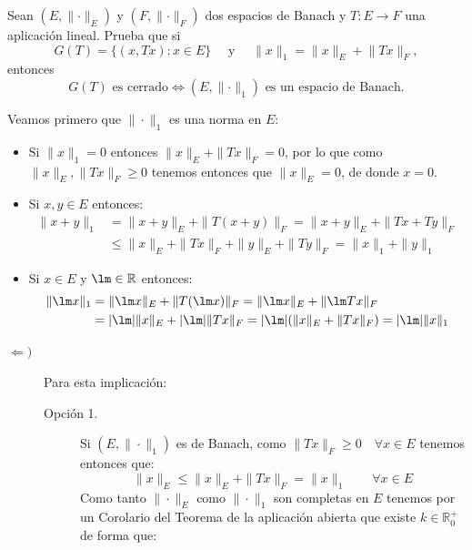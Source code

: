 \documentclass[12pt]{article}
\newcommand{\norma}[1]{\lVert #1 \rVert}
\newcommand{\normagenerica}{\lVert \cdot \rVert}
\begin{document}
    \begin{ejercicio}[3.5 Puntos]
        Sean $(E, \normagenerica_E)$ y $(F, \normagenerica_F)$ dos espacios de Banach y $T : E \to F$ una aplicación lineal. Prueba que si
        $$G(T) = \{(x,Tx) : x \in E\} \quad \text{ y } \quad \norma{x}_1 = \norma{x}_E + \norma{Tx}_F,$$ entonces
        $$G(T) \text{ es cerrado} \iff (E, \normagenerica_1) \text{ es un espacio de Banach.}$$

        \noindent
        Veamos primero que $\|\cdot \|_1$ es una norma en $E$:
        \begin{itemize}
            \item Si $\|x\|_1 = 0$ entonces $\|x\|_E+\|Tx\|_F= 0$, por lo que como $\|x\|_E,\|Tx\|_F\geq 0$ tenemos entonces que $\|x\|_E = 0$, de donde $x=0$.
            \item Si $x,y\in E$ entonces:
                \begin{align*}
                    \|x+y\|_1 &= \|x+y\|_E + \|T(x+y)\|_F = \|x+y\|_E + \|Tx+Ty\|_F \\
                              &\leq \|x\|_E + \|Tx\|_F + \|y\|_E + \|Ty\|_F = \|x\|_1 + \|y\|_1
                \end{align*}
            \item Si $x\in E$ y $\lm\in \mathbb{R}$ entonces:
                \begin{align*}
                    \|\lm x\|_1 &= \|\lm x\|_E + \|T(\lm x)\|_F = \|\lm x\|_E + \|\lm Tx\|_F \\
                                &= |\lm| \|x\|_E + |\lm| \|Tx\|_F = |\lm| (\|x\|_E + \|Tx\|_F) = |\lm| \|x\|_1
                \end{align*}
        \end{itemize}
        \begin{description}
            \item [$\Longleftarrow )$] Para esta implicación:
                \begin{description}
                    \item [Opción 1.] Si $(E,\|\cdot \|_1)$ es de Banach, como $\|Tx\|_F\geq 0 \quad \forall x\in E$ tenemos entonces que:
                        \begin{equation*}
                            \|x\|_E \leq \|x\|_E + \|Tx\|_F = \|x\|_1 \qquad \forall x\in E
                        \end{equation*}
                        Como tanto $\|\cdot \|_E$ como $\|\cdot \|_1$ son completas en $E$ tenemos por un Corolario del Teorema de la aplicación abierta que existe $k\in \mathbb{R}^+_0$ de forma que:

\end{description}
\end{description}
\end{ejercicio}
\end{document}
